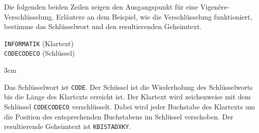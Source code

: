 \question[4]
Die folgenden beiden Zeilen zeigen den Ausgangspunkt für 
eine Vigenère-Verschlüsselung. Erläutere an dem Beispiel, wie die Verschlüsselung 
funktioniert, bestimme das Schlüsselwort und den resultierenden Geheimtext.


\texttt{INFORMATIK}  (Klartext)\\
\texttt{CODECODECO}  (Schlüssel)\\


\begin{solutionbox}{3cm}
 
Das Schlüsselwort ist \texttt{CODE}. Der Schüssel ist die Wiederholung des Schlüsselworts bis die
Länge des Klartexts erreicht ist. Der Klartext wird 
zeichenweise mit dem Schlüssel \texttt{CODECODECO} 
verschlüsselt. Dabei wird jeder Buchstabe des Klartexts um die Position des 
entsprechenden Buchstabens im Schlüssel verschoben.
Der resultierende Geheimtext ist \texttt{KBISTADXKY}.
 
\end{solutionbox}